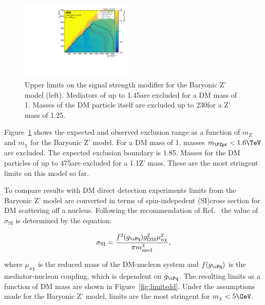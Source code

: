 \begin{figure}[htbp]
  \centering
  \includegraphics[width=0.475\textwidth]{figures/limits/limit2d_zpb_monohbb_.pdf}
  \caption{Upper limits on the signal strength modifier for the Baryonic Z' model (left). Mediators of up to 1.45\TeV are excluded for a DM mass of 1\GeV. Masses of the DM particle itself are excluded up to 230\GeV for a Z' mass of 1.25\TeV.}
  \label{fig:limits}
\end{figure}




Figure~\ref{fig:limits} shows the expected and observed exclusion range as a function of $m_{\text{Z}'}$ and $m_{\chi}$ for the Baryonic Z' model. For a DM mass of 1\GeV, masses $\mzp<1.6\TeV$ are excluded. The expected exclusion boundary is 1.85\TeV. Masses for the DM particles of up to 475\GeV are excluded for a 1.1\TeV Z' mass. These are the most stringent limits on this model so far. %

To compare results with DM direct detection experiments limits from the Baryonic Z' model are converted in terms of spin-indepedent (SI)cross section \SigSI for DM scattering off a nucleus.
Following the recommendation of Ref.~\cite{presentDM} the value of $\sigma_\text{SI}$ is determined by the equation:

\begin{equation}
\sigma_\text{SI} = \frac{f^2(g_{\cPq})g^2_{\mathrm{DM}}\mu^2_{\mathrm{n}\chi}}{\pi m^4_{\mathrm{med}}},
\end{equation}

where $\mu_{\mathrm{n}\chi}$ is the reduced mass of the DM-nucleon system and $f(g_{\cPq})$ is the mediator-nucleon coupling, which is dependent on $g_{\cPq}$.
The resulting \SigSI limits as a function of DM mass are shown in Figure~\ref{fig:limitsdd}.
Under the assumptions made for the Baryonic Z' model, limits are the most stringent for $m_\chi < 5\GeV$.


